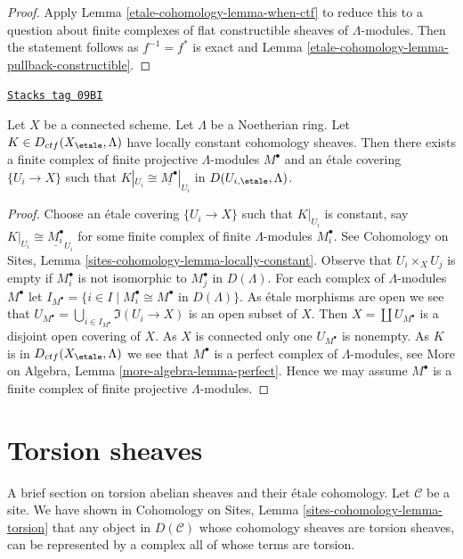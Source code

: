 \begin{proof}
Apply Lemma \ref{etale-cohomology-lemma-when-ctf} to reduce this to a question
about finite complexes of flat constructible sheaves of $\Lambda$-modules.
Then the statement follows as $f^{-1} = f^*$ is exact and
Lemma \ref{etale-cohomology-lemma-pullback-constructible}.
\end{proof}

\begin{lemma}
\label{etale-cohomology-lemma-connected-ctf-locally-constant}
\href{https://stacks.math.columbia.edu/tag/09BI}{\texttt{Stacks tag 09BI}}

Let $X$ be a connected scheme. Let $\Lambda$ be a Noetherian ring.
Let $K \in D_{ctf}(X_\etale, \Lambda)$ have locally constant cohomology sheaves.
Then there exists a finite complex of finite projective $\Lambda$-modules
$M^\bullet$ and an \'etale covering $\{U_i \to X\}$ such that
$K|_{U_i} \cong \underline{M^\bullet}|_{U_i}$ in $D(U_{i, \etale}, \Lambda)$.
\end{lemma}

\begin{proof}
Choose an \'etale covering $\{U_i \to X\}$ such that $K|_{U_i}$
is constant, say $K|_{U_i} \cong \underline{M_i^\bullet}_{U_i}$
for some finite complex of finite $\Lambda$-modules $M_i^\bullet$.
See Cohomology on Sites, Lemma
\ref{sites-cohomology-lemma-locally-constant}.
Observe that $U_i \times_X U_j$ is empty if $M_i^\bullet$
is not isomorphic to $M_j^\bullet$ in $D(\Lambda)$.
For each complex of $\Lambda$-modules $M^\bullet$ let
$I_{M^\bullet} =
\{i \in I \mid M_i^\bullet \cong M^\bullet\text{ in }D(\Lambda)\}$.
As \'etale morphisms are open we see that
$U_{M^\bullet} = \bigcup_{i \in I_{M^\bullet}} \Im(U_i \to X)$
is an open subset of $X$. Then $X = \coprod U_{M^\bullet}$ is a disjoint
open covering of $X$. As $X$ is connected only one $U_{M^\bullet}$
is nonempty. As $K$ is in $D_{ctf}(X_\etale, \Lambda)$ we see that $M^\bullet$
is a perfect complex of $\Lambda$-modules, see
More on Algebra, Lemma \ref{more-algebra-lemma-perfect}.
Hence we may assume $M^\bullet$ is a finite complex of finite projective
$\Lambda$-modules.
\end{proof}

\section{Torsion sheaves}
\label{etale-cohomology-section-torsion}
A brief section on torsion abelian sheaves and their \'etale cohomology.
Let $\mathcal{C}$ be a site. We have shown in
Cohomology on Sites, Lemma \ref{sites-cohomology-lemma-torsion}
that any object in $D(\mathcal{C})$ whose cohomology sheaves are
torsion sheaves, can be represented by a complex all of whose terms
are torsion.

